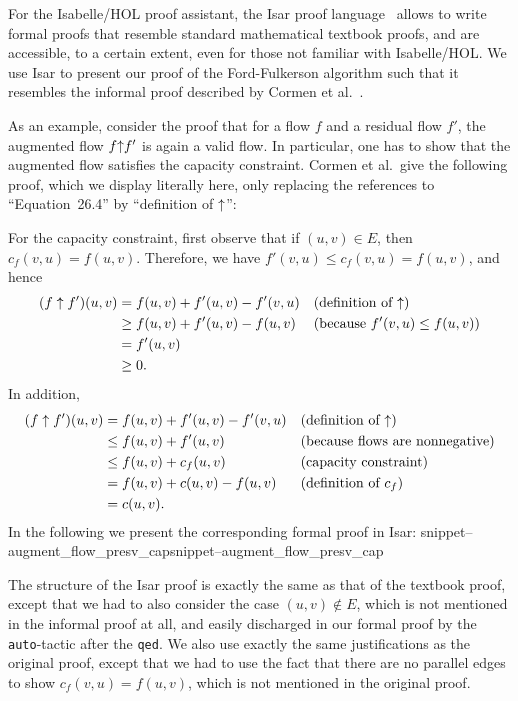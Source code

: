 \documentclass[smallcondensed]{svjour3}     %
\newcommand{\isai}{\lstinline[language=isabelle,basicstyle=\normalsize\ttfamily\slshape]}
\newcommand{\Snippet}[1]{\ifcsname snippet--#1\endcsname\csname snippet--#1\endcsname\else\PackageError{}{No snippet '#1' defined.}{}\fi}
\begin{document}
For the Isabelle/HOL proof assistant, the Isar proof language~\cite{Wenzel99} allows to write formal proofs that resemble standard mathematical textbook proofs, and are accessible, to a certain extent, even for those not familiar with Isabelle/HOL. 
We use Isar to present our proof of the Ford-Fulkerson algorithm such that it resembles the informal proof described by Cormen et al.~\cite{CLRS09}.

As an example, consider the proof that for a flow $f$ and a residual flow $f'$, the augmented flow $f{\mathbin\uparrow} f'$ is again a valid flow. In particular, one has to show 
that the augmented flow satisfies the capacity constraint. Cormen et al.~give the following proof, which we display literally here, only replacing the references to 
``Equation~26.4'' by ``definition of ${\mathbin\uparrow}$'':

For the capacity constraint, first observe that if $(u, v) \in E$, then $c_f(v, u) = f(u, v)$. Therefore, we have $f'(v,u) \leq c_f(v, u) = f(u, v)$, and hence
	\begin{align*}
	(f \uparrow f') (u, v) &= f(u, v) + f'(u, v) - f'(v, u)  && \text{(definition of ${\mathbin\uparrow}$)} \\
	& \geq f(u, v) + f'(u, v) - f(u, v) && \text{(because $f'(v,u) \leq f(u, v)$)} \\
	& = f'(u, v) \\
	& \geq 0.
	\end{align*}
In addition,
	\begin{align*}
	(f \uparrow f') (u, v) &= f(u, v) + f'(u, v) - f'(v, u)  && \text{(definition of ${\mathbin\uparrow}$)} \\
	& \leq f(u, v) + f'(u, v) && \text{(because flows are nonnegative)} \\
	& \leq f(u, v) + c_f(u, v) &&  \text{(capacity constraint)} \\
	& = f(u, v) + c(u, v) - f(u, v) && \text{(definition of $c_f$)} \\
	& = c (u, v).
	\end{align*}
% 
In the following we present the corresponding formal proof in Isar:
\Snippet{augment_flow_presv_cap}
The structure of the Isar proof is exactly the same as that of the textbook proof, except that we had to also consider the case $(u,v)\notin E$, which is not mentioned in the informal proof at all, and easily discharged in our formal proof by the \isai{auto}-tactic after the \isai{qed}. We also use exactly the same justifications as the original proof, except that we had to use the fact that there are no parallel edges to show $c_f(v,u)=f(u,v)$, which is not mentioned in the original proof.
\end{document}
